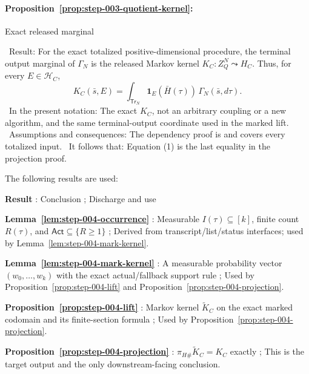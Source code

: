 \paragraph{Proposition~\ref{prop:step-003-quotient-kernel}:}
Exact released marginal

\noindent\textbullet\ Result: For the exact totalized positive-dimensional procedure,
  the terminal output marginal of \(\Gamma_N\) is the released Markov
  kernel \(K_C:Z_Q^N\leadsto H_C\). Thus, for every
  \(E\in\mathcal H_C\),
  \[
  K_C(\bar s,E)
  =\int_{\mathsf{Tr}_N}
    \mathbf1_E(\bar H(\tau))\,\Gamma_N(\bar s,d\tau).
  \tag{1}
  \]
\noindent\textbullet\ In the present notation: The exact \(K_C\), not an arbitrary coupling or a
  new algorithm, and the same terminal-output coordinate used in the marked
  lift.
\noindent\textbullet\ Assumptions and consequences: The dependency proof is
    and covers every totalized input.
\noindent\textbullet\ It follows that: Equation (1) is the last equality in the projection
  proof.

The following results are used:

\noindent\textbf{ Result }:  Conclusion ;  Discharge and use \par
\noindent\textbf{ Lemma~\ref{lem:step-004-occurrence} }:  Measurable \(I(\tau)\subseteq[k]\), finite count \(R(\tau)\), and \(\mathsf{Act}\subseteq\{R\geq1\}\) ;  Derived from  transcript/list/status interfaces; used by Lemma~\ref{lem:step-004-mark-kernel}. \par
\noindent\textbf{ Lemma~\ref{lem:step-004-mark-kernel} }:  A measurable probability vector \((w_0,\ldots,w_k)\) with the exact actual/fallback support rule ;  Used by Proposition~\ref{prop:step-004-lift} and Proposition~\ref{prop:step-004-projection}. \par
\noindent\textbf{ Proposition~\ref{prop:step-004-lift} }:  Markov kernel \(\widetilde K_C\) on the exact marked codomain and its finite-section formula ;  Used by Proposition~\ref{prop:step-004-projection}. \par
\noindent\textbf{ Proposition~\ref{prop:step-004-projection} }:  \(\pi_{H\#}\widetilde K_C=K_C\) exactly ;  This is the target output and the only downstream-facing conclusion. \par



